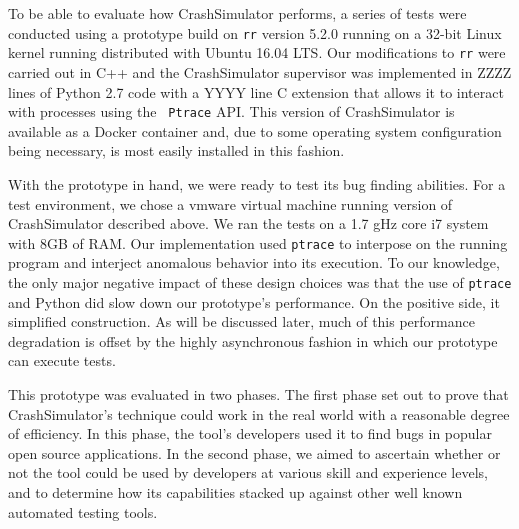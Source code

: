 To be able to evaluate how CrashSimulator performs, a series of tests were
conducted using a prototype build on {\tt rr} version 5.2.0 running on a
32-bit Linux kernel running distributed with  Ubuntu 16.04 LTS.  Our
modifications to {\tt rr} were carried out in C++ and the CrashSimulator
supervisor was implemented in ZZZZ lines of Python 2.7 code with a YYYY
line C extension that allows it to interact with processes using the {\tt
Ptrace} API.  This version of CrashSimulator is available as a Docker
container and, due to some operating system configuration being necessary,
is most easily installed in this fashion.

With the prototype in hand, we were ready to test its bug finding
abilities.  For a test environment, we chose
a vmware virtual machine running version of CrashSimulator described above.
We ran the tests on a 1.7 gHz
core i7 system with 8GB of RAM. Our implementation used {\tt ptrace} to
interpose on the running program and interject anomalous behavior into its
execution.  To our knowledge, the only major negative impact of
these design choices was that the use of {\tt ptrace} and Python did slow
down our
prototype's performance.  On the positive side, it simplified construction.
As will be discussed later, much of this performance
degradation is offset by the highly asynchronous fashion in which our
prototype can execute tests.

This prototype was evaluated in two phases.  The first phase set out to
prove that CrashSimulator's technique could work in the real world with a
reasonable degree of efficiency.  In this phase, the tool's developers used
it to find bugs in popular open source applications.  In the second phase,
we aimed to ascertain whether or not the tool could be used by developers
at various skill and experience levels, and to determine how its
capabilities stacked up against other well known automated testing tools.
